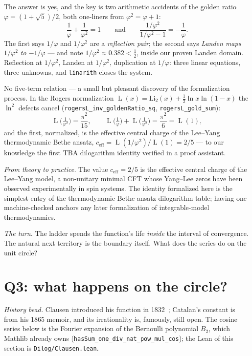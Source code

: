 \documentclass[11pt]{article}
\newcommand{\lean}[1]{\texttt{#1}}
\newcommand{\Li}{\mathrm{Li}_2}
\DeclareMathOperator{\Lrog}{L}
\newcommand{\keyeq}[1]{\begin{center}\keybox{$\displaystyle #1$}\end{center}}
\begin{document}
The answer is yes, and the key is two arithmetic accidents of the golden ratio
$\varphi=(1+\sqrt5)/2$, both one-liners from $\varphi^2=\varphi+1$:
\[
\frac{1}{\varphi}+\frac{1}{\varphi^2}=1
\qquad\text{and}\qquad
\frac{1/\varphi^2}{1/\varphi^2-1}=-\frac{1}{\varphi}.
\]
The first says $1/\varphi$ and $1/\varphi^2$ are a \emph{reflection pair}; the second
says \emph{Landen maps $1/\varphi^2$ to $-1/\varphi$} --- and note
$1/\varphi^2\approx0.382<\tfrac12$, inside our proven Landen domain. Reflection at
$1/\varphi^2$, Landen at $1/\varphi^2$, duplication at $1/\varphi$: three linear
equations, three unknowns, and \lean{linarith} closes the system.
\keyeq{
\Li\!\Big(\tfrac{1}{\varphi^2}\Big)=\tfrac{\pi^2}{15}-\ln^2\varphi,
\qquad
\Li\!\Big(\tfrac{1}{\varphi}\Big)=\tfrac{\pi^2}{10}-\ln^2\varphi,
\qquad
\Li\!\Big(-\tfrac{1}{\varphi}\Big)=\tfrac{\ln^2\varphi}{2}-\tfrac{\pi^2}{15}.
}
No five-term relation --- a small but pleasant discovery of the formalization process.
In the Rogers normalization $\Lrog(x)=\Li(x)+\tfrac12\ln x\ln(1-x)$ the $\ln^2$ defects
cancel (\lean{rogersL\_inv\_goldenRatio\_sq}, \lean{rogersL\_gold\_sum}):
\[
\Lrog\!\Big(\tfrac{1}{\varphi^2}\Big)=\frac{\pi^2}{15},\qquad
\Lrog\!\Big(\tfrac{1}{\varphi}\Big)+\Lrog\!\Big(\tfrac{1}{\varphi^2}\Big)
=\frac{\pi^2}{6}=\Lrog(1),
\]
and the first, normalized, is the effective central charge of the Lee--Yang
thermodynamic Bethe ansatz, $c_{\mathrm{eff}}=\Lrog(1/\varphi^2)/\Lrog(1)=2/5$ --- to
our knowledge the first TBA dilogarithm identity verified in a proof assistant.

\emph{From theory to practice.} The value $c_{\mathrm{eff}}=2/5$ is the effective central
charge of the Lee--Yang model, a non-unitary minimal CFT whose Yang--Lee zeros have been
observed experimentally in spin systems. The identity formalized here is the simplest
entry of the thermodynamic-Bethe-ansatz dilogarithm table; having one machine-checked
anchors any later formalization of integrable-model thermodynamics.

\emph{The turn.} The ladder spends the function's life \emph{inside} the interval of
convergence. The natural next territory is the boundary itself. What does the series do
on the unit circle?

\section{Q3: what happens on the circle?}\label{sec:circle}

\emph{History bead.} Clausen introduced his function in 1832~\cite{clausen}; Catalan's
constant is from his 1865 memoir, and its irrationality is, famously, still open. The
cosine series below is the Fourier expansion of the Bernoulli polynomial $B_2$, which
Mathlib already owns (\lean{hasSum\_one\_div\_nat\_pow\_mul\_cos}); the Lean of this
section is \lean{Dilog/Clausen.lean}.
\end{document}
